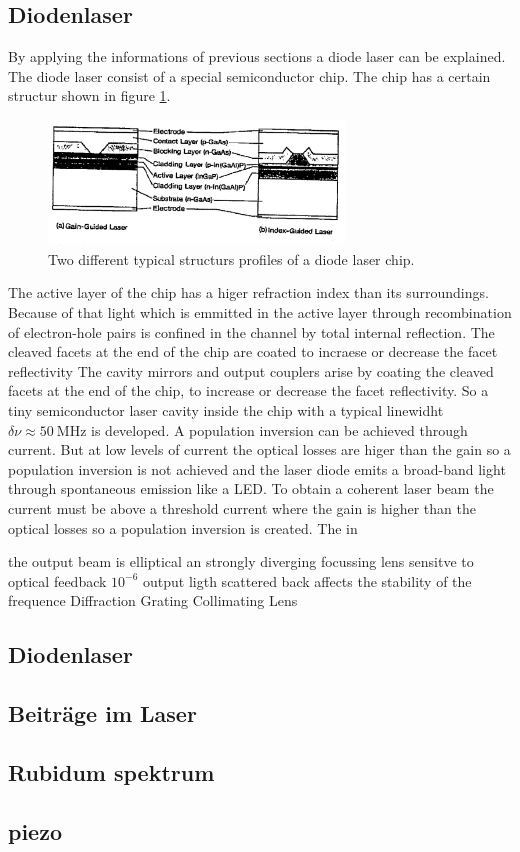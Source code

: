 \subsection{Diodenlaser}
\label{sec:Diodenlaser}
By applying the informations of previous sections
a diode laser can be explained.
The diode laser consist of a special semiconductor chip.
The chip has a certain structur shown in figure \ref{fig:chip}.
\begin{figure}
  \centering
  \includegraphics[width=0.7\textwidth]{chip.png}
  \caption{Two different typical structurs profiles of a diode laser chip.}
  \label{fig:chip}
\end{figure}
The active layer of the chip has a higer refraction index than
its surroundings. Because of that light which is emmitted
in the active layer through recombination of electron-hole pairs
is confined in the channel by total internal reflection.
The cleaved facets at the end of the chip
are coated to incraese or decrease the facet reflectivity
The cavity mirrors and output couplers arise
by coating the cleaved facets at the end of the chip,
to increase or decrease the facet reflectivity.
So a tiny semiconductor laser cavity inside the chip
with a typical linewidht
$\delta \nu \approx \SI{50}{\mega\hertz}$
is developed.
A population inversion
can be achieved through current.
But at low levels of current
the optical losses are higer than the gain
so a population inversion is not achieved and
the laser diode emits a broad-band light
through spontaneous emission
like a LED.
To obtain a coherent laser beam the current must be above
a threshold current where the gain is higher than the
optical losses so a population inversion is created.
The in

the output beam is elliptical an strongly diverging
focussing lens
sensitve to optical feedback
$10^{-6}$ output ligth scattered back affects the stability of the frequence
Diffraction Grating
Collimating Lens




\subsection{Diodenlaser}
\label{subsec:diodenlaser}


\subsection{Beiträge im Laser}
\label{subsec:}



\subsection{Rubidum spektrum}
\label{subsec:}


\subsection{piezo}
\label{subsec:}
